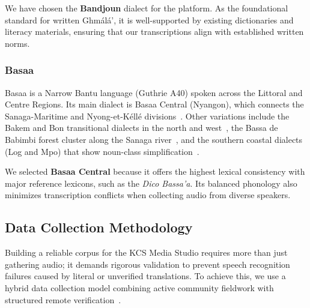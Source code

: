 \documentclass[a4paper,11pt]{article}
\begin{document}
We have chosen the \textbf{Bandjoun} dialect for the platform. As the foundational standard for written Gh\textopeno m\'al\'a', it is well-supported by existing dictionaries and literacy materials, ensuring that our transcriptions align with established written norms.

\subsubsection{Basaa}
Basaa is a Narrow Bantu language (Guthrie A40) spoken across the Littoral and Centre Regions. Its main dialect is Basaa Central (Nyangon), which connects the Sanaga-Maritime and Nyong-et-K\'ell\'e divisions~\cite{njiki2015grammaire}. Other variations include the Bakem and Bon transitional dialects in the north and west~\cite{bitjaa2017dialectologie}, the Bassa de Babimbi forest cluster along the Sanaga river~\cite{guarisma2003basaa}, and the southern coastal dialects (Log and Mpo) that show noun-class simplification~\cite{mbassi2011bantu}.

We selected \textbf{Basaa Central} because it offers the highest lexical consistency with major reference lexicons, such as the \textit{Dico Bassa'a}. Its balanced phonology also minimizes transcription conflicts when collecting audio from diverse speakers.

\subsection{Data Collection Methodology}
\label{sec:datacollection}

Building a reliable corpus for the KCS Media Studio requires more than just gathering audio; it demands rigorous validation to prevent speech recognition failures caused by literal or unverified translations. To achieve this, we use a hybrid data collection model combining active community fieldwork with structured remote verification~\cite{simons2020building}. 
\end{document}
